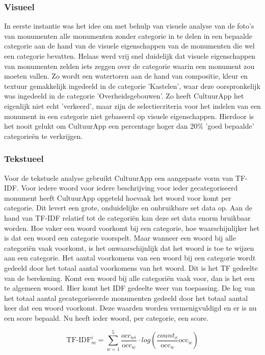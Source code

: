 \documentclass[a4paper,10pt]{article}
\begin{document}
		\subsubsection{Visueel}
		In eerste instantie was het idee om met behulp van visuele analyse van de foto's van monumenten alle monumenten zonder categorie in te delen in een bepaalde categorie aan de hand van de visuele eigenschappen van de monumenten die wel een categorie bevatten. Helaas werd vrij snel duidelijk dat visuele eigenschappen van monumenten zelden iets zeggen over de categorie waarin een monument zou moeten vallen. Zo wordt een watertoren aan de hand van compositie, kleur en textuur gemakkelijk ingedeeld in de categorie 'Kastelen', waar deze oorspronkelijk was ingedeeld in de categorie 'Overheidsgebouwen'. Zo heeft CultuurApp het eigenlijk niet echt 'verkeerd', maar zijn de selectiecriteria voor het indelen van een monument in een categorie niet gebaseerd op visuele eigenschappen. Hierdoor is het nooit gelukt om CultuurApp een percentage hoger dan 20\% 'goed bepaalde' categorie\"en te verkrijgen.
	
		\subsubsection{Tekstueel}
		Voor de tekstuele analyse gebruikt CultuurApp een aangepaste vorm van TF-IDF. Voor iedere woord voor iedere beschrijving voor ieder gecategoriseerd monument heeft CultuurApp opgeteld hoevaak het woord voor komt per categorie. Dit levert een grote, onduidelijke en onbruikbare set data op. Aan de hand van TF-IDF relatief tot de categori\"en kan deze set data enorm bruikbaar worden. Hoe vaker een woord voorkomt bij een categorie, hoe waarschijnlijker het is dat een woord een categorie voorspelt. Maar wanneer een woord bij alle categori\"en vaak voorkomt, is het onwaarschijnlijk dat het woord is toe te wijzen aan een categorie. Het aantal voorkomens van een woord bij een categorie wordt gedeeld door het totaal aantal voorkomens van het woord. Dit is het TF gedeelte van de berekening. Komt een woord bij alle categori\"en vaak voor, dan is het een te algemeen woord. Hier komt het IDF gedeelte weer van toepassing. De log van het totaal aantal gecategoriseerde monumenten gedeeld door het totaal aantal keer dat een woord voorkomt. Deze waarden worden vermenigvuldigd en er is nu een score bepaald. Nu heeft ieder woord, per categorie, een score.
		
		\begin{equation}
		\text{TF-IDF}_m^i = \sum_{w=1}^5\frac{occ_{wi}}{\text{occ}_w} \cdot log\left(\frac{count_x}{\text{occ}_w}{\text{occ}_w}\right)
		\end{equation}
		
\end{document}
